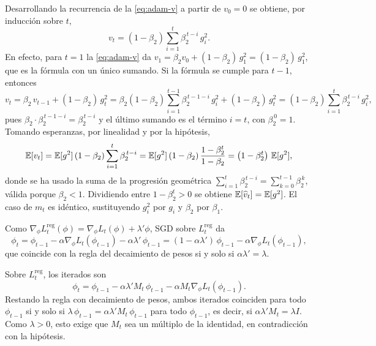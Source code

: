 \begin{demostracion}
Desarrollando la recurrencia de la \cref{eq:adam-v} a partir de $v_0 = 0$ se
obtiene, por inducción sobre $t$,
\[
  v_t = (1 - \beta_2) \sum_{i=1}^{t} \beta_2^{\,t-i}\, g_i^{2}.
\]
En efecto, para $t = 1$ la \cref{eq:adam-v} da
$v_1 = \beta_2 v_0 + (1-\beta_2)\, g_1^2 = (1-\beta_2)\, g_1^2$, que es la
fórmula con un único sumando. Si la fórmula se cumple para $t-1$, entonces
\[
  v_t = \beta_2\, v_{t-1} + (1-\beta_2)\, g_t^2
      = \beta_2 (1-\beta_2) \sum_{i=1}^{t-1} \beta_2^{\,t-1-i}\, g_i^{2} + (1-\beta_2)\, g_t^2
      = (1-\beta_2) \sum_{i=1}^{t} \beta_2^{\,t-i}\, g_i^{2},
\]
pues $\beta_2 \cdot \beta_2^{\,t-1-i} = \beta_2^{\,t-i}$ y el último sumando es
el término $i = t$, con $\beta_2^{\,0} = 1$.
Tomando esperanzas, por linealidad y por la hipótesis,
\[
  \operatorname{\mathbb{E}}[v_t] = \operatorname{\mathbb{E}}[g^2]\, (1 - \beta_2) \sum_{i=1}^{t} \beta_2^{\,t-i}
          = \operatorname{\mathbb{E}}[g^2]\, (1 - \beta_2)\, \frac{1 - \beta_2^{t}}{1 - \beta_2}
          = \bigl(1 - \beta_2^{t}\bigr)\, \operatorname{\mathbb{E}}[g^2],
\]
donde se ha usado la suma de la progresión geométrica
$\sum_{i=1}^{t} \beta_2^{\,t-i} = \sum_{k=0}^{t-1} \beta_2^{\,k}$, válida porque
$\beta_2 < 1$. Dividiendo entre $1 - \beta_2^t > 0$ se obtiene
$\operatorname{\mathbb{E}}[\widehat{v}_t] = \operatorname{\mathbb{E}}[g^2]$. El caso de $m_t$ es idéntico, sustituyendo
$g_i^2$ por $g_i$ y $\beta_2$ por $\beta_1$.
\end{demostracion}

\begin{demostracion}
Como $\nabla_\phi L_t^{\mathrm{reg}}(\phi) = \nabla_\phi L_t(\phi) + \lambda' \phi$,
SGD sobre $L_t^{\mathrm{reg}}$ da
\[
  \phi_t = \phi_{t-1} - \alpha \nabla_\phi L_t(\phi_{t-1}) - \alpha \lambda'\, \phi_{t-1}
           = (1 - \alpha\lambda')\, \phi_{t-1} - \alpha \nabla_\phi L_t(\phi_{t-1}),
\]
que coincide con la regla del decaimiento de pesos si y solo si
$\alpha\lambda' = \lambda$.
\end{demostracion}

\begin{demostracion}
Sobre $L_t^{\mathrm{reg}}$, los iterados son
\[
  \phi_t = \phi_{t-1} - \alpha\lambda' M_t\, \phi_{t-1} - \alpha M_t \nabla_\phi L_t(\phi_{t-1}).
\]
Restando la regla con decaimiento de pesos, ambos iterados coinciden para todo
$\phi_{t-1}$ si y solo si $\lambda\, \phi_{t-1} = \alpha\lambda' M_t\, \phi_{t-1}$
para todo $\phi_{t-1}$, es decir, si $\alpha\lambda' M_t = \lambda I$. Como
$\lambda > 0$, esto exige que $M_t$ sea un múltiplo de la identidad, en
contradicción con la hipótesis.
\end{demostracion}

